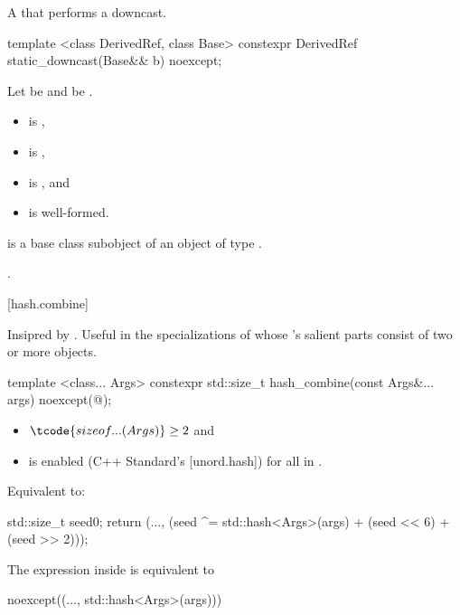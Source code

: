 \pnum
A  that performs a downcast.

%
\begin{itemdecl}
template <class DerivedRef, class Base>
constexpr DerivedRef static_downcast(Base&& b) noexcept;
\end{itemdecl}

\begin{itemdescr}
\pnum
Let  be 
and  be .

\pnum
\constraints
\begin{itemize}
\item
   is ,
\item
   is ,
\item
   is , and
\item
   is well-formed.
\end{itemize}

\pnum
\expects
{} is a base class subobject
of an object of type .

\pnum
\returns
{}.
\end{itemdescr}

[hash.combine]{}

\pnum
Insipred by .
Useful in the specializations of 
whose 's salient parts consist of two or more objects.

%
\begin{itemdecl}
template <class... Args>
constexpr std::size_t hash_combine(const Args&... args) noexcept(@\seebelow@);
\end{itemdecl}

\begin{itemdescr}
\pnum
\constraints
\begin{itemize}
\item
  $\tcode{sizeof...(Args)} \geq 2$ and
\item
   is enabled (C++ Standard's [unord.hash])
  for all  in .
\end{itemize}

\pnum
\effects
Equivalent to:
\begin{codeblock}
std::size_t seed{0};
return (..., (seed ^= std::hash<Args>{}(args) + (seed << 6) + (seed >> 2)));
\end{codeblock}

\pnum
\remarks
The expression inside  is equivalent to
\begin{codeblock}
noexcept((..., std::hash<Args>{}(args)))
\end{codeblock}
\end{itemdescr}
